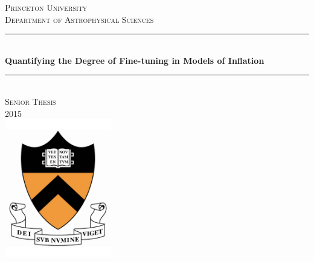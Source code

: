 \documentclass[a4paper,11pt]{article}
\begin{document}
\begin{titlepage}

\newcommand{\HRule}{\rule{\linewidth}{0.5mm}} %

\begin{centering}
\textsc{\huge Princeton University}\\
\textsc{\Large Department of Astrophysical Sciences}\\[2cm]
\end{centering}
\center %



\HRule \\[0.4cm]
{\LARGE \bfseries Quantifying the Degree of Fine-tuning in Models of Inflation}\\[0.4cm] %
\HRule \\[1cm]

\textsc{\Large Senior Thesis}\\[0cm] %

\textsc{\Large 2015}\\[2cm] %
\includegraphics[width=0.35\textwidth]{figures/PrincetonShield.pdf}\\[2cm]


\end{titlepage}
\end{document}
